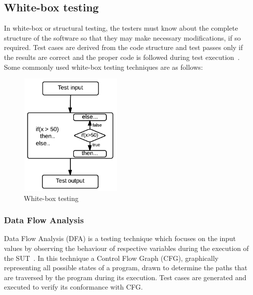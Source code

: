 \subsection{White-box testing}
In white-box or structural testing, the testers must know about the complete structure of the software so that they may make necessary modifications, if so required. Test cases are derived from the code structure and test passes only if the results are correct and the proper code is followed during test execution~\cite{ostrand2002white}. Some commonly used white-box testing techniques are as follows:
\begin{figure}[h]
\begin{center}
	\includegraphics[width=5cm, height=6cm ]{chapter2/whiteBox.png}
	\caption{White-box testing}
	\label{fig:blackBox}
\end{center}  
\end{figure}
%  

\subsubsection{Data Flow Analysis}
Data Flow Analysis (DFA) is a testing technique which focuses on the input values by observing the behaviour of respective variables during the execution of the SUT~\cite{clarke1989formal}. In this technique a Control Flow Graph (CFG), graphically representing all possible states of a program, drawn to determine the paths that are traversed by the program during its execution. Test cases are generated and executed to verify its conformance with CFG. 


